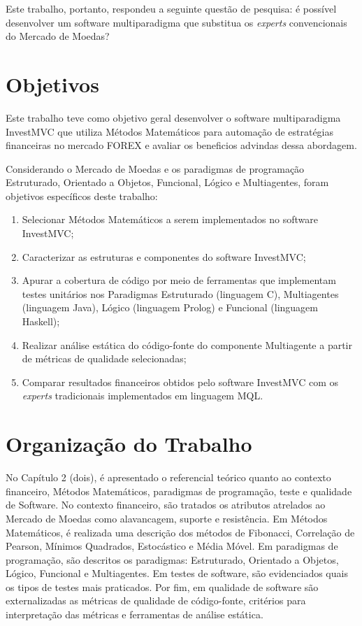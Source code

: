Este trabalho, portanto, respondeu a seguinte questão de pesquisa: é possível desenvolver um software multiparadigma que substitua os \textit{experts} convencionais do Mercado de Moedas?

\section{Objetivos}
Este trabalho teve como objetivo geral desenvolver o software multiparadigma InvestMVC que utiliza Métodos Matemáticos para automação de estratégias financeiras no mercado FOREX e avaliar os beneficios advindas dessa abordagem.

Considerando o Mercado de Moedas e os paradigmas de programação Estruturado, Orientado a Objetos, Funcional, Lógico e Multiagentes, foram objetivos específicos deste trabalho:

\begin{enumerate}
\item  Selecionar Métodos Matemáticos a serem implementados no software InvestMVC;

\item Caracterizar as estruturas e componentes do software InvestMVC;

\item Apurar a cobertura de código por meio de ferramentas que implementam testes unitários nos Paradigmas Estruturado (linguagem C), Multiagentes (linguagem Java), Lógico (linguagem Prolog) e Funcional (linguagem Haskell);

\item  Realizar análise estática do código-fonte do componente Multiagente a partir de métricas de qualidade selecionadas;

\item Comparar resultados financeiros obtidos pelo software InvestMVC com os \textit{experts} tradicionais implementados em linguagem MQL.
\end{enumerate}

\section{Organização do Trabalho}
No Capítulo 2 (dois), é apresentado o referencial teórico quanto ao contexto financeiro, Métodos Matemáticos, paradigmas de programação, teste e qualidade de Software. No contexto financeiro, são tratados os atributos atrelados ao Mercado de Moedas como alavancagem, suporte e resistência. Em Métodos Matemáticos, é realizada uma descrição dos métodos de Fibonacci, Correlação de Pearson, Mínimos Quadrados, Estocástico e Média Móvel. Em paradigmas de programação, são descritos os paradigmas: Estruturado, Orientado a Objetos, Lógico, Funcional e Multiagentes. Em testes de software, são evidenciados quais os tipos de testes mais praticados. Por fim, em qualidade de software são externalizadas as métricas de qualidade de código-fonte, critérios para interpretação das métricas e ferramentas de análise estática.

